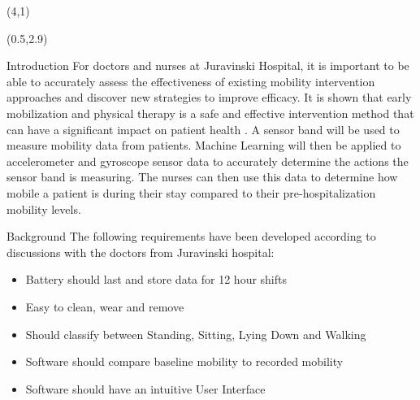 \documentclass[22pt]{beamer}
\begin{document}
\begin{frame}[fragile]
\begin{textblock}{9}(4,1)
\titlepage
\end{textblock}

\begin{textblock}{7.25}(0.5,2.9)

\vspace{0.5cm}

\begin{block}{Introduction}
For doctors and nurses at Juravinski Hospital, it is important to be able to accurately assess the effectiveness of existing mobility intervention approaches and discover new strategies to improve efficacy. It is shown that early mobilization and physical therapy is a safe and effective intervention method that can have a significant impact on patient health \cite{adler2012early}. A sensor band will be used to measure mobility data from patients. Machine Learning will then be applied to accelerometer and gyroscope sensor data to accurately determine the actions the sensor band is measuring. The nurses can then use this data to determine how mobile a patient is during their stay compared to their pre-hospitalization mobility levels.


\end{block}

\begin{block}{Background}
The following requirements have been developed according to discussions with the doctors from Juravinski hospital:

\begin{itemize}
\item Battery should last and store data for 12 hour shifts
\item Easy to clean, wear and remove
\item Should classify between Standing, Sitting, Lying Down and Walking
\item Software should compare baseline mobility to recorded mobility
\item Software should have an intuitive User Interface
\end{itemize}
\end{block}


\end{textblock}
\end{frame}
\end{document}

